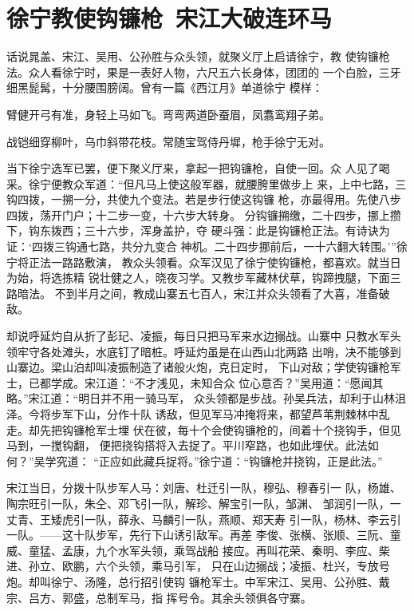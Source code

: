 \chapter{徐宁教使钩镰枪~宋江大破连环马}

话说晁盖、宋江、吴用、公孙胜与众头领，就聚义厅上启请徐宁，教
使钩镰枪法。众人看徐宁时，果是一表好人物，六尺五六长身体，团团的
一个白脸，三牙细黑髭髯，十分腰围膀阔。曾有一篇《西江月》单道徐宁
模样：

臂健开弓有准，身轻上马如飞。弯弯两道卧蚕眉，凤翥鸾翔子弟。

战铠细穿柳叶，乌巾斜带花枝。常随宝驾侍丹墀，枪手徐宁无对。

当下徐宁选军已罢，便下聚义厅来，拿起一把钩镰枪，自使一回。众
人见了喝采。徐宁便教众军道：“但凡马上使这般军器，就腰胯里做步上
来，上中七路，三钩四拨，一搠一分，共使九个变法。若是步行使这钩镰
枪，亦最得用。先使八步四拨，荡开门户；十二步一变，十六步大转身。
分钩镰搠缴，二十四步，挪上攒下，钩东拨西；三十六步，浑身盖护，夺
硬斗强：此是钩镰枪正法。有诗诀为证：‘四拨三钩通七路，共分九变合
神机。二十四步挪前后，一十六翻大转围。’”徐宁将正法一路路敷演，
教众头领看。众军汉见了徐宁使钩镰枪，都喜欢。就当日为始，将选拣精
锐壮健之人，晓夜习学。又教步军藏林伏草，钩蹄拽腿，下面三路暗法。
不到半月之间，教成山寨五七百人，宋江并众头领看了大喜，准备破敌。

却说呼延灼自从折了彭玘、凌振，每日只把马军来水边搦战。山寨中
只教水军头领牢守各处滩头，水底钉了暗桩。呼延灼虽是在山西山北两路
出哨，决不能够到山寨边。梁山泊却叫凌振制造了诸般火炮，克日定时，
下山对敌；学使钩镰枪军士，已都学成。宋江道：“不才浅见，未知合众
位心意否？”吴用道：“愿闻其略。”宋江道：“明日并不用一骑马军，
众头领都是步战。孙吴兵法，却利于山林沮泽。今将步军下山，分作十队
诱敌，但见军马冲掩将来，都望芦苇荆棘林中乱走。却先把钩镰枪军士埋
伏在彼，每十个会使钩镰枪的，间着十个挠钩手，但见马到，一搅钩翻，
便把挠钩搭将入去捉了。平川窄路，也如此埋伏。此法如何？”吴学究道：
“正应如此藏兵捉将。”徐宁道：“钩镰枪并挠钩，正是此法。”

宋江当日，分拨十队步军人马：刘唐、杜迁引一队，穆弘、穆春引一
队，杨雄、陶宗旺引一队，朱仝、邓飞引一队，解珍、解宝引一队，邹渊、
邹润引一队，一丈青、王矮虎引一队，薛永、马麟引一队，燕顺、郑天寿
引一队，杨林、李云引一队。——这十队步军，先行下山诱引敌军。再差
李俊、张横、张顺、三阮、童威、童猛、孟康，九个水军头领，乘驾战船
接应。再叫花荣、秦明、李应、柴进、孙立、欧鹏，六个头领，乘马引军，
只在山边搦战；凌振、杜兴，专放号炮。却叫徐宁、汤隆，总行招引使钩
镰枪军士。中军宋江、吴用、公孙胜、戴宗、吕方、郭盛，总制军马，指
挥号令。其余头领俱各守寨。

